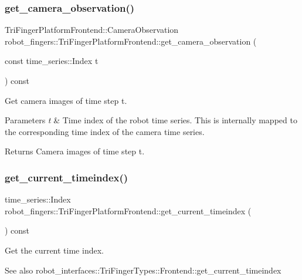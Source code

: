 \subsubsection{\texorpdfstring{get\+\_\+camera\+\_\+observation()}{get\_camera\_observation()}}
{\footnotesize\ttfamily Tri\+Finger\+Platform\+Frontend\+::\+Camera\+Observation robot\+\_\+fingers\+::\+Tri\+Finger\+Platform\+Frontend\+::get\+\_\+camera\+\_\+observation (\begin{DoxyParamCaption}\item[{const time\+\_\+series\+::\+Index}]{t }\end{DoxyParamCaption}) const}



Get camera images of time step t. 


\begin{DoxyParams}{Parameters}
{\em t} & Time index of the robot time series. This is internally mapped to the corresponding time index of the camera time series.\\
\hline
\end{DoxyParams}
\begin{DoxyReturn}{Returns}
Camera images of time step t. 
\end{DoxyReturn}
\mbox{\label{classrobot__fingers_1_1TriFingerPlatformFrontend_a9c97379d70b40a023609521a83253177}} 
\subsubsection{\texorpdfstring{get\+\_\+current\+\_\+timeindex()}{get\_current\_timeindex()}}
{\footnotesize\ttfamily time\+\_\+series\+::\+Index robot\+\_\+fingers\+::\+Tri\+Finger\+Platform\+Frontend\+::get\+\_\+current\+\_\+timeindex (\begin{DoxyParamCaption}{ }\end{DoxyParamCaption}) const}



Get the current time index. 

\begin{DoxySeeAlso}{See also}
robot\+\_\+interfaces\+::\+Tri\+Finger\+Types\+::\+Frontend\+::get\+\_\+current\+\_\+timeindex 
\end{DoxySeeAlso}
\mbox{\label{classrobot__fingers_1_1TriFingerPlatformFrontend_acdb76e148024bfdcb59bf06a92f30222}} 
